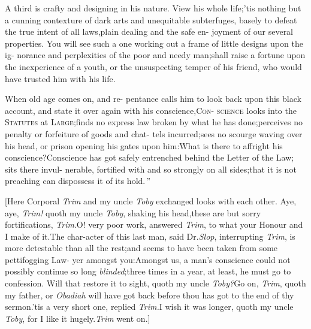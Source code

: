 \documentclass{article}
\begin{document}
\lqq A third is crafty and designing in\break
\lqq his nature. View his whole life;\tsk ’tis\break
\lqq nothing but a cunning contexture of\break
\lqq dark arts and unequitable subterfuges,\break
\lqq basely to defeat the true intent of all\break
\lqq laws,\tsh plain dealing and the safe en-\break
\lqq joyment of our several properties.\tsh{} 
\lqq You will see such a one working out\break
\lqq a frame of little designs upon the ig-\break
\lqq norance and perplexities of the poor\break
\lqq and needy man;\tsk shall raise a fortune\break
\lqq upon the inexperience of a youth, or\break
\lqq the unsuspecting temper of his friend,\break
\lqq who would have trusted him with his\break
\lqq life.

\lqq When old age comes on, and re-\break
\lqq pentance calls him to look back upon\break
\lqq this black account, and state it over\break
\lqq again with his conscience,\tsh \textsc{Con}-\break
\lqq \textsc{science} looks into the \textsc{Statutes} at\break
\lqq \textsc{Large};\tsk finds no express law broken\break
\lqq by what he has done;\tsk perceives no\break
\lqq penalty or forfeiture of goods and chat-\break
\lqq tels incurred;\tsk sees no scourge waving\break
\lqq over his head, or prison opening his\break
\lqq gates upon him:\tsk What is there to\break
\lqq affright his conscience?\tsk Conscience
\lqq has got safely entrenched behind the\break
\lqq Letter of the Law; sits there invul-\break
\lqq nerable, fortified with  and \break
\lqq {} so strongly on all sides;\tsk that\break
\lqq it is not preaching can dispossess it of\break
\lqq its hold.\,”

[Here Corporal \textit{Trim} and my uncle \textit{Toby} exchanged
looks with each other.\tsk\break
Aye, \tsk aye, \textit{Trim!} quoth my uncle \textit{Toby}, shaking
his head,\tsh these are but sorry fortifications,
\textit{Trim}.\tsh O! very poor work, answered \textit{Trim}, to
what your Honour and I make of it.\tsh The char-\break acter of this
last man, said Dr.\@ \textit{Slop}, interrupting \textit{Trim},
is more detestable than\break
all the rest;\tsh and seems to have\break
been taken from some pettifogging Law-\break
yer amongst you:\tsk Amongst us, a\break
man’s conscience could not possibly continue so long
\textit{blinded};\tsk three times in
a year, at least, he must go to confession. Will that restore it
to sight, quoth my uncle
\textit{Toby?}\tsk Go on, \textit{Trim}, quoth my father, or
\textit{Obadiah} will have got back before thou has got to the
end of thy\break
sermon.\tsh ’tis a very short one, replied
\textit{Trim.}\tsk I wish it was longer, quoth my uncle
\textit{Toby}, for I like it hugely.\tsk \textit{Trim} went on.]
\end{document}
